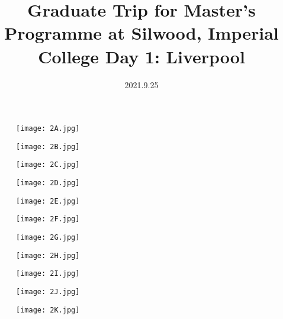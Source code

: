 \documentclass[11pt]{article}
\title{Graduate Trip for Master's Programme at Silwood, Imperial College \newline Day 1: Liverpool}
\date{2021.9.25}
\begin{document}
  \maketitle
  
  \newpage

  \linenumbers

\begin{figure}[H]
    \centering
    \texttt{[image: 2A.jpg]}
\end{figure}

\begin{figure}[H]
    \centering
    \texttt{[image: 2B.jpg]}
\end{figure}

\begin{figure}[H]
    \centering
    \texttt{[image: 2C.jpg]}
\end{figure}

\begin{figure}[H]
    \centering
    \texttt{[image: 2D.jpg]}
\end{figure}

\begin{figure}[H]
    \centering
    \texttt{[image: 2E.jpg]}
\end{figure}

\begin{figure}[H]
    \centering
    \texttt{[image: 2F.jpg]}
\end{figure}

\begin{figure}[H]
    \centering
    \texttt{[image: 2G.jpg]}
\end{figure}

\begin{figure}[H]
    \centering
    \texttt{[image: 2H.jpg]}
\end{figure}

\begin{figure}[H]
    \centering
    \texttt{[image: 2I.jpg]}
\end{figure}

\begin{figure}[H]
    \centering
    \texttt{[image: 2J.jpg]}
\end{figure}

\begin{figure}[H]
    \centering
    \texttt{[image: 2K.jpg]}
\end{figure}
\end{document}
